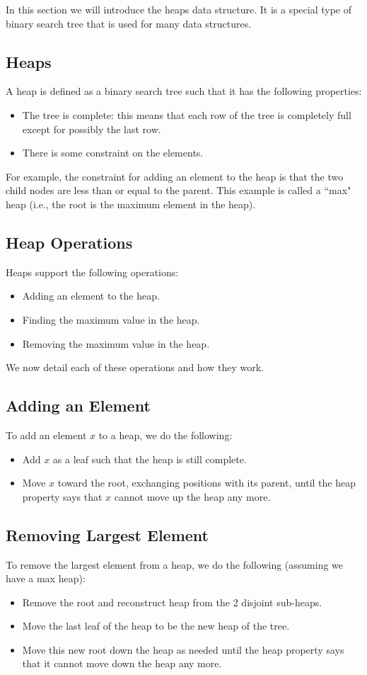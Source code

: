 %
In this section we will introduce the heaps data structure. It is a special type of binary search tree that is used for many data structures.

\subsection*{Heaps}
A heap is defined as a binary search tree such that it has the following properties:
\begin{itemize}
\item The tree is complete: this means that each row of the tree is completely full except for possibly the last row.
\item There is some constraint on the elements.
\end{itemize}
For example, the constraint for adding an element to the heap is that the two child nodes are less than or equal to the parent. This example is called a ``max" heap (i.e., the root is the maximum element in the heap).

\subsection*{Heap Operations}
Heaps support the following operations:
\begin{itemize}
\item Adding an element to the heap.
\item Finding the maximum value in the heap.
\item Removing the maximum value in the heap.
\end{itemize}
We now detail each of these operations and how they work.

\subsection*{Adding an Element}
To add an element $x$ to a heap, we do the following:
\begin{itemize}
\item Add $x$ as a leaf such that the heap is still complete.
\item Move $x$ toward the root, exchanging positions with its parent, until the heap property says that $x$ cannot move up the heap any more.
\end{itemize}

\subsection*{Removing Largest Element}
To remove the largest element from a heap, we do the following (assuming we have a max heap):
\begin{itemize}
\item Remove the root and reconstruct heap from the 2 disjoint sub-heaps.
\item Move the last leaf of the heap to be the new heap of the tree.
\item Move this new root down the heap as needed until the heap property says that it cannot move down the heap any more.
\end{itemize}

